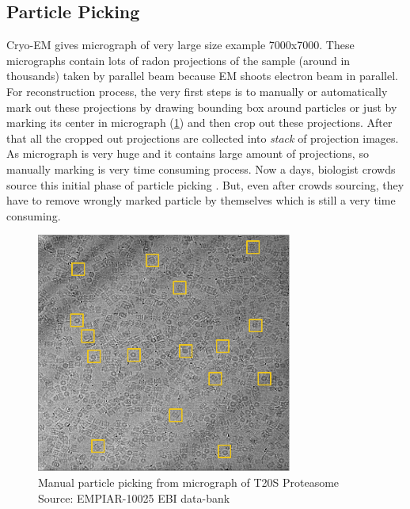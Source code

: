 \documentclass{report}
\begin{document}
\subsection{Particle Picking}
Cryo-EM gives micrograph of very large size example 7000x7000. These micrographs contain lots of radon projections of the sample (around in thousands) taken by parallel beam because EM shoots electron beam in parallel. For reconstruction process, the very first steps is to manually or automatically mark out these projections by drawing bounding box around particles or just by marking its center in micrograph (\ref{fig:pp_from_micrograph}) and then crop out these projections. After that all the cropped out projections are collected into \textit{stack} of projection images. As micrograph is very huge and it contains large amount of projections, so manually marking is very time consuming process. Now a days, biologist crowds source this initial phase of particle picking \cite{bruggemann2017exploring}. But, even after crowds sourcing, they have to remove wrongly marked particle by themselves which is still a very time consuming.  

\begin{figure}[h]
\includegraphics[width=0.75\textwidth]{micrograph_pp_10025}
\centering
\captionsetup{justification=centering}
\caption{ Manual particle picking from micrograph of T20S Proteasome Source: EMPIAR-10025 EBI data-bank\protect\footnotemark}
\label{fig:pp_from_micrograph}
\end{figure}
\end{document}
